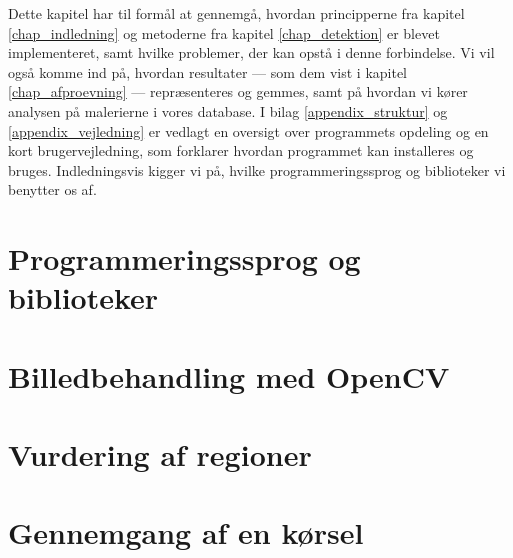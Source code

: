 {
{\sffamily Dette kapitel har til formål at gennemgå, hvordan
principperne fra kapitel \ref{chap_indledning} og metoderne fra kapitel
\ref{chap_detektion} er blevet implementeret, samt hvilke problemer, der
kan opstå i denne forbindelse. Vi vil også komme ind på, hvordan
resultater --- som dem vist i kapitel \ref{chap_afproevning} ---
repræsenteres og gemmes, samt på hvordan vi kører analysen på malerierne
i vores database. I bilag \ref{appendix_struktur} og
\ref{appendix_vejledning} er vedlagt en oversigt over programmets
opdeling og en kort brugervejledning, som forklarer hvordan programmet
kan installeres og bruges.  Indledningsvis kigger vi på, hvilke
programmeringssprog og biblioteker vi benytter os af.
}

\section{Programmeringssprog og biblioteker\label{section_programmeringssprog}}


\section{Billedbehandling med OpenCV\label{section_impBilledbehandling}}


\section{Vurdering af regioner\label{section_vurdering_regioner}}


\section{Gennemgang af en kørsel\label{section_koersel}}


%

}
